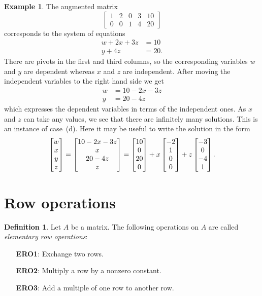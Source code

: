 \documentclass[reqno]{amsart}
\theoremstyle{definition}
\newtheorem{definition}[theorem]{Definition}
\newtheorem{example}[theorem]{Example}
\begin{document}
\begin{example}\label{eg-rref-solve-iii}
 The augmented matrix
 \[ \left[\begin{array}{cccc|c}
     1 & 2 & 0 & 3 & 10 \\
     0 & 0 & 1 & 4 & 20
    \end{array}\right]
 \]
 corresponds to the system of equations
 \begin{align*}
  w + 2x + 3z &= 10 \\
  y + 4z &= 20.
 \end{align*}
 There are pivots in the first and third columns, so the corresponding
 variables $w$ and $y$ are dependent whereas $x$ and $z$ are
 independent.  After moving the independent variables to the right
 hand side we get
 \begin{align*}
  w &= 10 - 2x - 3z \\
  y &= 20 - 4z
 \end{align*}
 which expresses the dependent variables in terms of the independent
 ones.  As $x$ and $z$ can take any values, we see that there are
 infinitely many solutions.  This is an instance of case~(d).  Here it
 may be useful to write the solution in the form 
 \[ \left[\begin{matrix} w \\ x \\ y \\ z \end{matrix}\right] =
    \left[\begin{matrix} 10-2x-3z \\ x \\ 20-4z \\ z \end{matrix}\right] =
    \left[\begin{matrix} 10 \\ 0 \\ 20 \\ 0 \end{matrix}\right] + 
    x \left[\begin{matrix} -2 \\ 1 \\ 0 \\ 0 \end{matrix}\right] + 
    z \left[\begin{matrix} -3 \\ 0 \\ -4 \\ 1 \end{matrix}\right].
 \]
\end{example}

\section{Row operations}
\label{sec-row-ops}

\begin{definition}\label{defn-ERO}
 Let $A$ be a matrix.  The following operations on $A$ are called
 \emph{elementary row operations}:
 \begin{itemize}
  \item[\textbf{ERO1}:] Exchange two rows.
  \item[\textbf{ERO2}:] Multiply a row by a nonzero constant.
  \item[\textbf{ERO3}:] Add a multiple of one row to another row.
 \end{itemize}
\end{definition}
\end{document}
